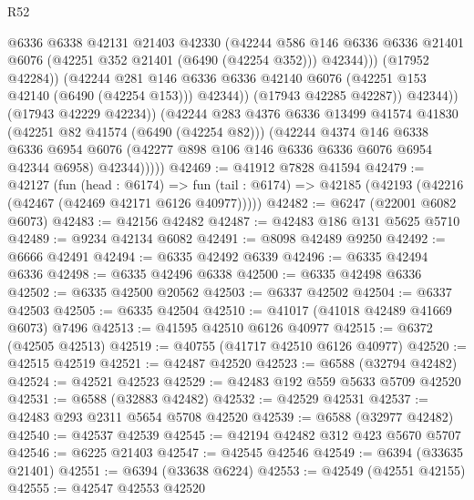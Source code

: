 \begin{lexlean}{R52}
\begin{coremodule}
                          @6336
                          @6338
                          @42131
                          @21403
                          @42330
                          (@42244
                            @586
                            @146
                            @6336
                            @6336
                            @21401
                            @6076
                            (@42251 @352 @21401 (@6490 (@42254 @352)))
                            @42344)))
                      (@17952 @42284))
                    (@42244
                      @281
                      @146
                      @6336
                      @6336
                      @42140
                      @6076
                      (@42251 @153 @42140 (@6490 (@42254 @153)))
                      @42344))
                  (@17943 @42285 @42287))
                @42344))
            (@17943 @42229 @42234))
          (@42244
            @283
            @4376
            @6336
            @13499
            @41574
            @41830
            (@42251 @82 @41574 (@6490 (@42254 @82)))
            (@42244
              @4374
              @146
              @6338
              @6336
              @6954
              @6076
              (@42277 @898 @106 @146 @6336 @6336 @6076 @6954 @42344 @6958)
              @42344)))))
@42469 := @41912 @7828 @41594
@42479 := @42127
    (fun (head : @6174) =>
    fun (tail : @6174) => @42185 (@42193 (@42216 (@42467 (@42469 @42171 @6126 @40977)))))
@42482 := @6247 (@22001 @6082 @6073)
@42483 := @42156 @42482
@42487 := @42483 @186 @131 @5625 @5710
@42489 := @9234 @42134 @6082
@42491 := @8098 @42489 @9250
@42492 := @6666 @42491
@42494 := @6335 @42492 @6339
@42496 := @6335 @42494 @6336
@42498 := @6335 @42496 @6338
@42500 := @6335 @42498 @6336
@42502 := @6335 @42500 @20562
@42503 := @6337 @42502
@42504 := @6337 @42503
@42505 := @6335 @42504
@42510 := @41017 (@41018 @42489 @41669 @6073) @7496
@42513 := @41595 @42510 @6126 @40977
@42515 := @6372 (@42505 @42513)
@42519 := @40755 (@41717 @42510 @6126 @40977)
@42520 := @42515 @42519
@42521 := @42487 @42520
@42523 := @6588 (@32794 @42482)
@42524 := @42521 @42523
@42529 := @42483 @192 @559 @5633 @5709 @42520
@42531 := @6588 (@32883 @42482)
@42532 := @42529 @42531
@42537 := @42483 @293 @2311 @5654 @5708 @42520
@42539 := @6588 (@32977 @42482)
@42540 := @42537 @42539
@42545 := @42194 @42482 @312 @423 @5670 @5707
@42546 := @6225 @21403
@42547 := @42545 @42546
@42549 := @6394 (@33635 @21401)
@42551 := @6394 (@33638 @6224)
@42553 := @42549 (@42551 @42155)
@42555 := @42547 @42553 @42520

\end{coremodule}
\end{lexlean}
